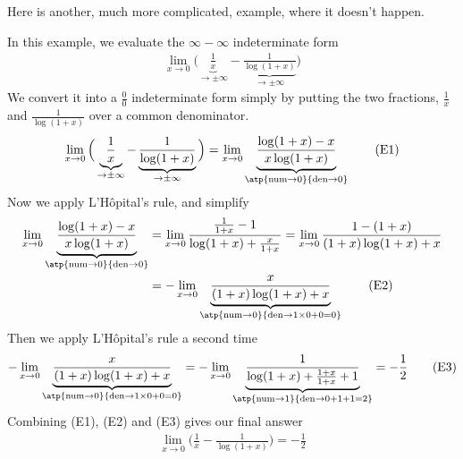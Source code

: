 \begin{enumerate}[(a)]
Here is another, much more complicated, example, where it doesn't happen.
\begin{eg}\label{eg:hopitalKK}
In this example, we evaluate the $\infty-\infty$ indeterminate form
\begin{align*}
\lim_{x\rightarrow 0}\Big(
                \underbrace{\frac{1}{x}}_{\rightarrow \pm\infty}
              - \underbrace{\frac{1}{\log(1+x)}}_{\rightarrow\pm\infty}\Big)
\end{align*}
We convert it into a $\frac{0}{0}$ indeterminate form simply
by putting the two fractions, $\frac{1}{x}$ and $\frac{1}{\log(1+x)}$
over a common denominator.
\begin{equation}
\lim_{x\rightarrow 0}\Big(
                \underbrace{\frac{1}{x}}_{\rightarrow \pm\infty}
              - \underbrace{\frac{1}{\log(1+x)}}_{\rightarrow\pm\infty}\Big)
=\lim_{x\rightarrow 0}\underbrace{\frac{\log(1+x)-x}{x\log(1+x)}}_{\atp
        {\mathrm{num}\rightarrow 0}
        {\mathrm{den}\rightarrow 0}}
\tag{E1}
\end{equation}
Now we apply L'H\^opital's rule, and simplify
\begin{align}
\lim_{x\rightarrow 0}\underbrace{\frac{\log(1+x)-x}{x\log(1+x)}}_{\atp
        {\mathrm{num}\rightarrow 0}
        {\mathrm{den}\rightarrow 0}}
&=\lim_{x\rightarrow 0}\frac{\frac{1}{1+x}-1} {\log(1+x)+\frac{x}{1+x}}
=\lim_{x\rightarrow 0}\frac{1-(1+x)} {(1+x)\log(1+x)+x}\notag\\
&=-\lim_{x\rightarrow 0}\underbrace{\frac{x} {(1+x)\log(1+x)+x}}_{\atp
        {\mathrm{num}\rightarrow 0}
        {\mathrm{den}\rightarrow 1\times 0+0=0}} \tag{E2}
\end{align}
Then we apply  L'H\^opital's rule a second time
\begin{equation}
-\lim_{x\rightarrow 0}\underbrace{\frac{x} {(1+x)\log(1+x)+x}}_{\atp
        {\mathrm{num}\rightarrow 0}
        {\mathrm{den}\rightarrow 1\times 0+0=0}}
=-\lim_{x\rightarrow 0}\underbrace{\frac{1} {\log(1+x)+\frac{1+x}{1+x}+1}}_{\atp
        {\mathrm{num}\rightarrow 1}
        {\mathrm{den}\rightarrow 0+1+1=2}}
=-\frac{1}{2}
\tag{E3}
\end{equation}
Combining (E1), (E2) and (E3) gives our final answer
\begin{align*}
\lim_{x\rightarrow 0}\Big(\frac{1}{x} - \frac{1}{\log(1+x)}\Big)
=-\frac{1}{2}
\end{align*}
\end{eg}


\end{enumerate}

